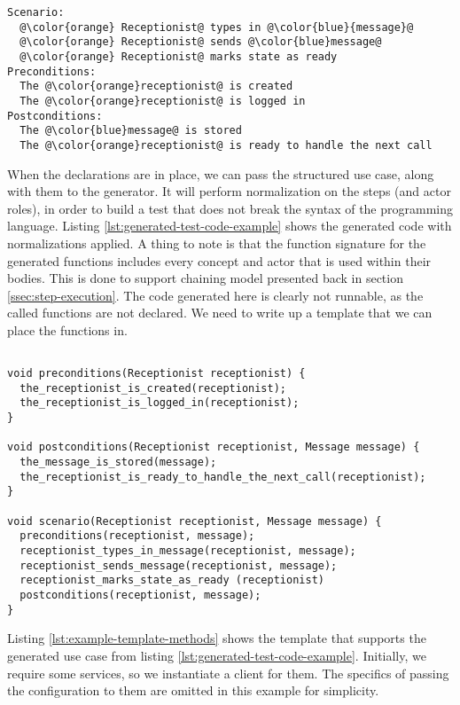 \begin{lstlisting}[frame=single,style=usecase, caption=Use case example with its different parts highlighted, label=lst:uc-simple-example-highlighted-revisited]
Scenario:
  @\color{orange} Receptionist@ types in @\color{blue}{message}@
  @\color{orange} Receptionist@ sends @\color{blue}message@
  @\color{orange} Receptionist@ marks state as ready
Preconditions:
  The @\color{orange}receptionist@ is created
  The @\color{orange}receptionist@ is logged in
Postconditions:
  The @\color{blue}message@ is stored
  The @\color{orange}receptionist@ is ready to handle the next call
\end{lstlisting} 
When the declarations are in place, we can pass the structured use case, along with them to the generator. It will perform normalization on the steps (and actor roles), in order to build a test that does not break the syntax of the programming language. Listing \ref{lst:generated-test-code-example} shows the generated code with normalizations applied. A thing to note is that the function signature for the generated functions includes every concept and actor that is used within their bodies. This is done to support chaining model presented back in section \ref{ssec:step-execution}. The code generated here is clearly not runnable, as the called functions are not declared. We need to write up a template that we can place the functions in.
\begin{lstlisting}[style=Dart, caption=Example of generated code without a template applied concept,label={lst:generated-test-code-example}]

void preconditions(Receptionist receptionist) {
  the_receptionist_is_created(receptionist);
  the_receptionist_is_logged_in(receptionist);
}

void postconditions(Receptionist receptionist, Message message) {
  the_message_is_stored(message);
  the_receptionist_is_ready_to_handle_the_next_call(receptionist);
}

void scenario(Receptionist receptionist, Message message) {
  preconditions(receptionist, message);
  receptionist_types_in_message(receptionist, message);
  receptionist_sends_message(receptionist, message);
  receptionist_marks_state_as_ready (receptionist)  
  postconditions(receptionist, message);
}

\end{lstlisting}

\noindent Listing \ref{lst:example-template-methods} shows the template that supports the generated use case from listing \ref{lst:generated-test-code-example}. Initially, we require some services, so we instantiate a client for them. The specifics of passing the configuration to them are omitted in this example for simplicity.\medskip

